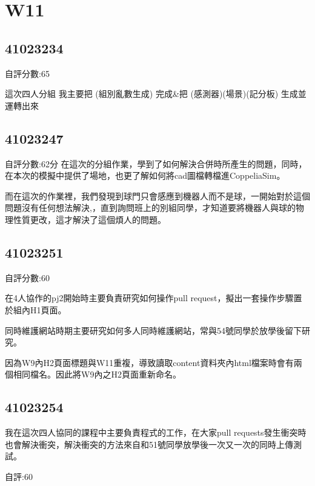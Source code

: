 \chapter{W11}


\section{41023234}
自評分數:65

這次四人分組 我主要把  (組別亂數生成)  完成&把  (感測器)(場景)(記分板)  生成並運轉出來


\section{41023247}
自評分數:62分
在這次的分組作業，學到了如何解決合併時所產生的問題，同時，在本次的模擬中提供了場地，也更了解如何將cad圖檔轉檔進CoppeliaSim。

而在這次的作業裡，我們發現到球門只會感應到機器人而不是球，一開始對於這個問題沒有任何想法解決,，直到詢問班上的別組同學，才知道要將機器人與球的物理性質更改，這才解決了這個煩人的問題。
\section{41023251}

自評分數:60

在4人協作的pj2開始時主要負責研究如何操作pull request，擬出一套操作步驟置於組內H1頁面。

同時維護網站時期主要研究如何多人同時維護網站，常與54號同學於放學後留下研究。

因為W9內H2頁面標題與W11重複，導致讀取content資料夾內html檔案時會有兩個相同檔名。因此將W9內之H2頁面重新命名。


\section{41023254}

我在這次四人協同的課程中主要負責程式的工作，在大家pull requests發生衝突時也會解決衝突，解決衝突的方法來自和51號同學放學後一次又一次的同時上傳測試。

自評:60